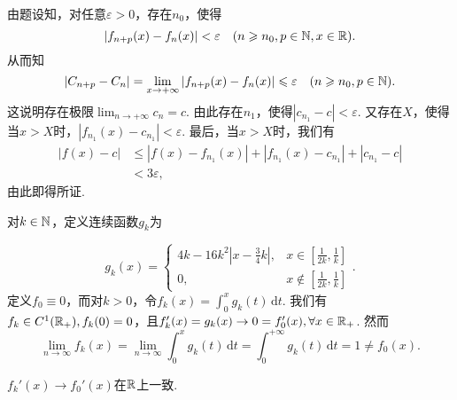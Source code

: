 \begin{ans}
  由题设知，对任意$\varepsilon>0$，存在$n_0$，使得
  \[
    |f_{n+p}(x)-f_n(x)|<\varepsilon\quad
    (n\geqslant n_0,p\in\mathbb N,x\in\mathbb R).
  \]
  从而知
  \[
    |C_{n+p}-C_n| = \lim_{x\to+\infty}
    |f_{n+p}(x) - f_n(x)| \le\varepsilon\quad
    (n\ge n_0,p\in\MN).
  \]
  这说明存在极限$\lim_{n\to+\infty}c_n=c$. 由此存在$n_1$，使得$|c_{n_1}-c|<\varepsilon$. 又存在$X$，使得当$x>X$时，$|f_{n_1}(x)-c_{n_1}|<\varepsilon$. 最后，当$x>X$时，我们有
  \begin{align*}
    |f(x)-c| & \le |f(x)-f_{n_1}(x)|+|f_{n_1}(x)-c_{n_1}|
        + |c_{n_1}-c |\\
        & <3\varepsilon,
  \end{align*}
  由此即得所证.
\end{ans}

\begin{ans}
  \begin{enumb}
    \item 对$k\in\mathbb N$，定义连续函数$g_k$为
  \end{enumb}
  \[
    g_k(x) = \begin{cases}
      4k-16k^2 \left|x-\frac34k \right|, & x\in\left[\frac1{2k},\frac1k\right]\\
      0, & x\notin\left[\frac1{2k},\frac1k\right]
    \end{cases}.
  \]
  定义$f_0\equiv0$，而对$k>0$，令$f_k(x)=\int_0^xg_k(t)\,\mathrm dt$. 我们有$f_k\in C^1(\mathbb R_+),f_k(0)=0$，且$f_k'(x)=g_k(x)\to0=f_0'(x),\forall x\in \mathbb R_+$. 然而
  \[
    \lim_{n\to\infty}f_k(x) = \lim_{n\to\infty}\int_0^xg_k(t)\,\mathrm dt=\int_0^{+\infty}g_k(t)\,\mathrm dt=1\ne f_0(x).
  \]
  \begin{enumb}\setcounter{enumi}{1}
    \item $f_k'(x)\to f_0'(x)$在$\mathbb R$上一致.
  \end{enumb}
\end{ans}

